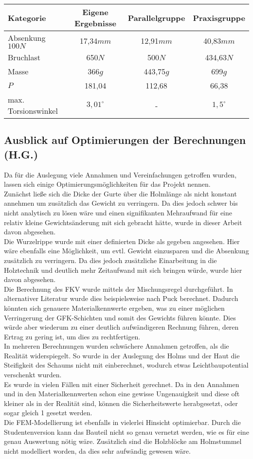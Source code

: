 \begin{center}
\begin{tabular}[h]{l|c|c|c}
Kategorie&Eigene Ergebnisse&Parallelgruppe&Praxisgruppe\\
\hline
Absenkung $100N$&17,34$mm$&12,91$mm$&40,83$mm$\\
Bruchlast&650$N$&500$N$&434,63$N$\\
Masse&366$g$&443,75$g$&699$g$\\
$P$&181,04&112,68&66,38\\
max. Torsionswinkel&$3,01^{\circ}$& - &$1,5^{\circ}$
\end{tabular}
\end{center}


\subsection{Ausblick auf Optimierungen der Berechnungen (H.G.)}
Da für die Auslegung viele Annahmen und Vereinfachungen getroffen wurden, lassen sich einige Optimierungsmöglichkeiten für das Projekt nennen.\\
\noindent
Zunächst ließe sich die Dicke der Gurte über die Holmlänge als nicht konstant annehmen um zusätzlich das Gewicht zu verringern. Da dies jedoch schwer bis nicht analytisch zu lösen wäre und einen signifikanten Mehraufwand für eine relativ kleine Gewichtsänderung mit sich gebracht hätte, wurde in dieser Arbeit davon abgesehen.\\
\noindent
Die Wurzelrippe wurde mit einer definierten Dicke als gegeben angesehen. Hier wäre ebenfalls eine Möglichkeit, um evtl. Gewicht einzusparen und die Absenkung zusätzlich zu verringern. Da dies jedoch zusätzliche Einarbeitung in die Holztechnik und deutlich mehr Zeitaufwand mit sich bringen würde, wurde hier davon abgesehen.\\
\noindent
Die Berechnung des FKV wurde mittels der Mischungsregel durchgeführt. In alternativer Literatur wurde dies beispielsweise nach Puck berechnet. Dadurch könnten sich genauere Materialkennwerte ergeben, was zu einer möglichen Verringerung der GFK-Schichten und somit des Gewichts führen könnte. Dies würde aber wiederum zu einer deutlich aufwändigeren Rechnung führen, deren Ertrag zu gering ist, um dies zu rechtfertigen.\\
\noindent
In mehreren Berechnungen wurden schwächere Annahmen getroffen, als die Realität widerspiegelt. So wurde in der Auslegung des Holms und der Haut die Steifigkeit des Schaums nicht mit einberechnet, wodurch etwas Leichtbaupotential verschenkt wurden.\\
\noindent
Es wurde in vielen Fällen mit einer Sicherheit gerechnet. Da in den Annahmen und in den Materialkennwerten schon eine gewisse Ungenauigkeit und diese oft kleiner als in der Realität sind, können die Sicherheitswerte herabgesetzt, oder sogar gleich 1 gesetzt werden.\\
\noindent
Die FEM-Modellierung ist ebenfalls in vielerlei Hinsicht optimierbar. Durch die Studentenversion kann das Bauteil nicht so genau vernetzt werden, wie es für eine genau Auswertung nötig wäre. Zusätzlich sind die Holzblöcke am Holmstummel nicht modelliert worden, da dies sehr aufwändig gewesen wäre.\\
\noindent